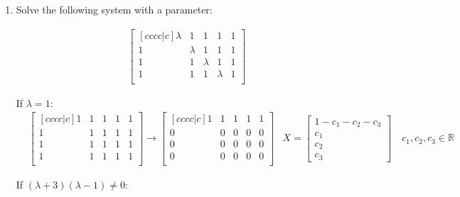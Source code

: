 \documentclass{article}
\begin{document}
\begin{enumerate}
\newpage
\item Solve the following system with a parameter:

\begin{align*}
\begin{bmatrix}[cccc|c]
\lambda & 1 & 1 & 1 & 1\\
1 & \lambda & 1 & 1 & 1\\
1 & 1 & \lambda & 1 & 1\\
1 & 1 & 1 & \lambda & 1\\
\end{bmatrix}
\end{align*}

If $\lambda = 1$:
\begin{align*}
&\begin{bmatrix}[cccc|c]
1 & 1 & 1 & 1 & 1\\
1 & 1 & 1 & 1 & 1\\
1 & 1 & 1 & 1 & 1\\
1 & 1 & 1 & 1 & 1\\
\end{bmatrix}
\to
\begin{bmatrix}[cccc|c]
1 & 1 & 1 & 1 & 1\\
0 & 0 & 0 & 0 & 0\\
0 & 0 & 0 & 0 & 0\\
0 & 0 & 0 & 0 & 0\\
\end{bmatrix}
&X = \begin{bmatrix}
1 - c_1 - c_2 - c_3\\c_1\\c_2\\c_3
\end{bmatrix} \quad c_1, c_2, c_3 \in \mathbb{R}
\end{align*}

If $(\lambda + 3)(\lambda - 1) \neq 0$:


\end{enumerate}
\end{document}
